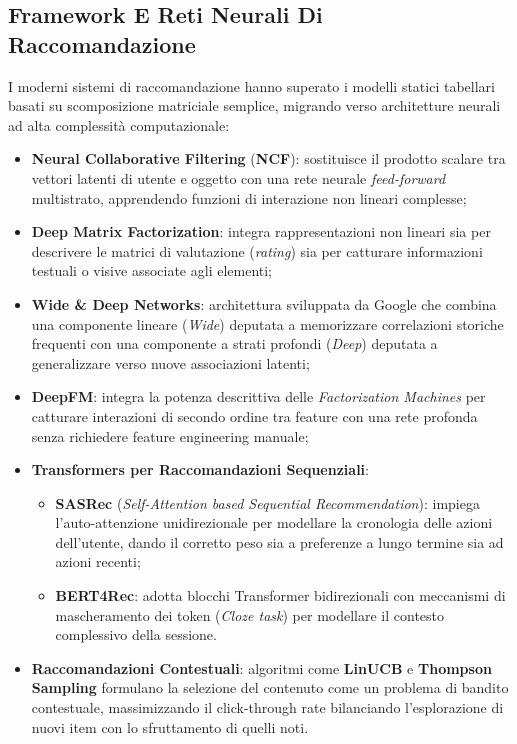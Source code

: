 \documentclass[11pt, a4paper]{article}
\begin{document}

\subsection{Framework E Reti Neurali Di Raccomandazione}

I moderni sistemi di raccomandazione hanno superato i modelli statici tabellari basati su scomposizione matriciale semplice, migrando verso architetture neurali ad alta complessità computazionale:
\begin{itemize}
    \item \textbf{Neural Collaborative Filtering} (\textbf{NCF}): sostituisce il prodotto scalare tra vettori latenti di utente e oggetto con una rete neurale \emph{feed-forward} multistrato, apprendendo funzioni di interazione non lineari complesse;
    \item \textbf{Deep Matrix Factorization}: integra rappresentazioni non lineari sia per descrivere le matrici di valutazione (\emph{rating}) sia per catturare informazioni testuali o visive associate agli elementi;
    \item \textbf{Wide \& Deep Networks}: architettura sviluppata da Google che combina una componente lineare (\emph{Wide}) deputata a memorizzare correlazioni storiche frequenti con una componente a strati profondi (\emph{Deep}) deputata a generalizzare verso nuove associazioni latenti;
    \item \textbf{DeepFM}: integra la potenza descrittiva delle \emph{Factorization Machines} per catturare interazioni di secondo ordine tra feature con una rete profonda senza richiedere feature engineering manuale;
    \item \textbf{Transformers per Raccomandazioni Sequenziali}:
    \begin{itemize}
        \item \textbf{SASRec} (\emph{Self-Attention based Sequential Recommendation}): impiega l'auto-attenzione unidirezionale per modellare la cronologia delle azioni dell'utente, dando il corretto peso sia a preferenze a lungo termine sia ad azioni recenti;
        \item \textbf{BERT4Rec}: adotta blocchi Transformer bidirezionali con meccanismi di mascheramento dei token (\emph{Cloze task}) per modellare il contesto complessivo della sessione.
    \end{itemize}
    \item \textbf{Raccomandazioni Contestuali}: algoritmi come \textbf{LinUCB} e \textbf{Thompson Sampling} formulano la selezione del contenuto come un problema di bandito contestuale, massimizzando il click-through rate bilanciando l'esplorazione di nuovi item con lo sfruttamento di quelli noti.
\end{itemize}
\end{document}
